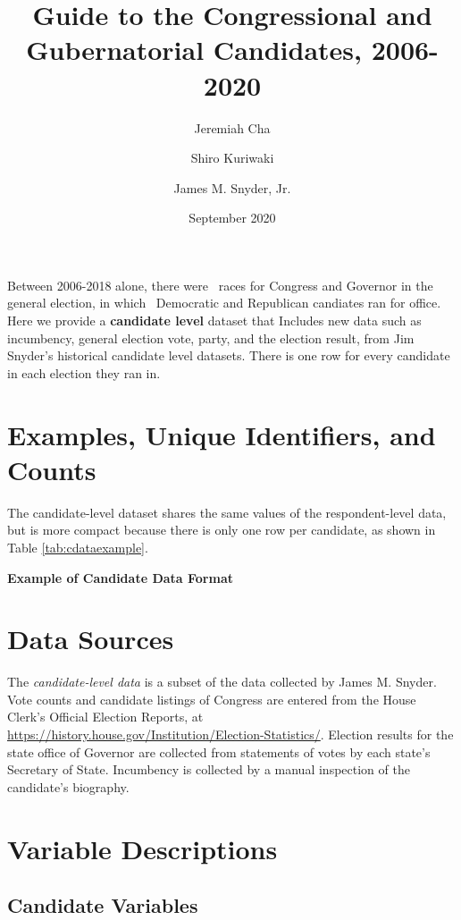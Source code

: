 \documentclass[12pt]{article}
\title{\large\textbf{Guide to the Congressional and Gubernatorial Candidates, 2006-2020}}
\author[1]{\normalsize Jeremiah Cha}
\author[2]{\normalsize Shiro Kuriwaki}
\author[1]{\normalsize James M. Snyder, Jr.}
\affil[1]{\footnotesize Department of Government, Harvard University.}
\affil[2]{\footnotesize To be Department of Political Science, Yale University}
\date{\normalsize September 2020}
\begin{document}
\maketitle 


Between 2006-2018 alone, there were \unskip \ races for Congress and Governor in the general election, in which \unskip \ Democratic and Republican candiates ran for office.  Here we provide a \textbf{candidate level} dataset that Includes new data such as incumbency, general election vote, party, and the election result, from Jim Snyder's historical candidate level datasets. There is one row for every candidate in each election they ran in. 


\section{Examples, Unique Identifiers, and Counts}

The candidate-level dataset shares the same values of the respondent-level data, but is more compact because there is only one row per candidate, as shown in Table \ref{tab:cdataexample}.

\begin{table}[!h]
\caption{\textbf{Example of Candidate Data Format} \label{tab:cdataexample}}
\centering
\footnotesize

\end{table}



\section{Data Sources}

The \emph{candidate-level data} is a subset of the data collected by James M. Snyder. Vote counts and candidate listings of Congress are entered from the House Clerk's Official Election Reports, at \url{https://history.house.gov/Institution/Election-Statistics/}.  Election results for the state office of Governor are collected from statements of votes by each state's Secretary of State.  Incumbency is collected by a manual inspection of the candidate's biography. 

\clearpage

\section{Variable Descriptions}

\subsection{Candidate Variables}
\end{document}
